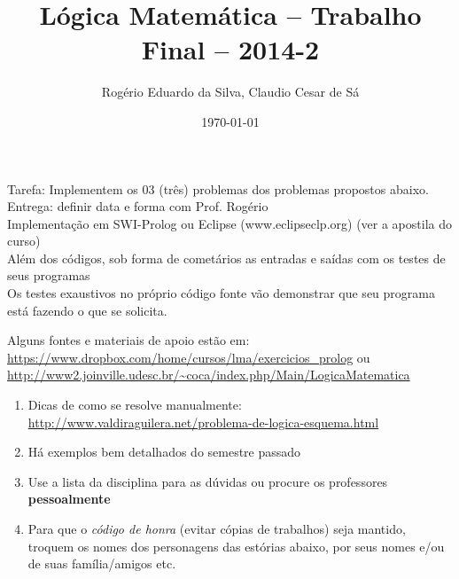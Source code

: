 \documentclass[a4paper,12pt]{article}
\title{Lógica Matemática -- Trabalho Final -- 2014-2}
\author{Rogério Eduardo da Silva, Claudio Cesar de Sá\\}
\date{\today}
\begin{document}
\maketitle

\begin{flushleft}

 Tarefa: Implementem os  03 (três)  problemas dos problemas propostos abaixo.\\
Entrega: definir data e forma com Prof. Rogério \\ 

 Implementação em SWI-Prolog ou Eclipse (www.eclipseclp.org) (ver a apostila do curso)\\

 Além dos códigos, sob forma de cometários as entradas e saídas com os testes de seus programas\\

 Os testes exaustivos no próprio código fonte vão demonstrar que seu programa está fazendo o que se solicita.


 Alguns fontes e materiais de apoio estão em:
 \url{https://www.dropbox.com/home/cursos/lma/exercicios_prolog} ou \\
  \url{http://www2.joinville.udesc.br/~coca/index.php/Main/LogicaMatematica}

\end{flushleft}

\begin{enumerate}
\setlength\itemsep{0.5cm}
\item Dicas de como se resolve manualmente:\\
\url{http://www.valdiraguilera.net/problema-de-logica-esquema.html}

\item Há exemplos bem detalhados do semestre passado\\

\item Use a lista da disciplina para as dúvidas ou procure
os professores \textbf{pessoalmente}\\

\item Para que o \textit{código de honra} (evitar cópias de trabalhos) seja mantido,
troquem os nomes dos personagens das estórias abaixo, por seus nomes e/ou de suas família/amigos etc. 

\end{enumerate}

\newpage
\tableofcontents
\end{document}
